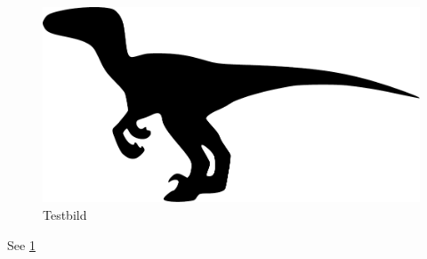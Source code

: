 \documentclass{scrartcl}
\begin{document}
\begin{figure}
	\centering
	\includegraphics{raptor}
	\caption{Testbild}
	\label{fig:testbild}
\end{figure}

See \cref{fig:testbild}
\end{document}
